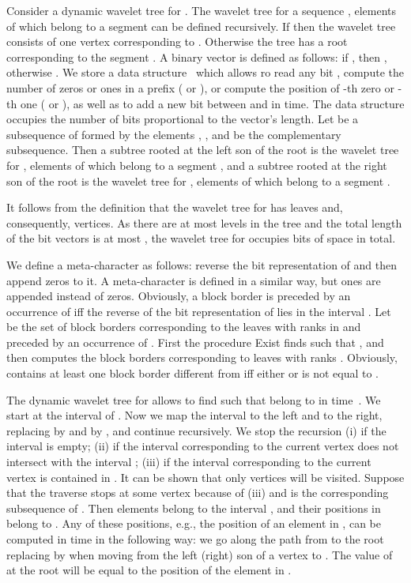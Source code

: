 \documentclass[10pt]{llncs}
\newcommand{\exist}{{\sc Exist}}
\begin{document}
Consider a dynamic wavelet tree for . The wavelet tree for a sequence , elements of which belong to a segment  can be defined recursively. If  then the wavelet tree consists of one vertex corresponding to . Otherwise the tree has a root corresponding to the segment . A binary vector  is defined as follows: if , then , otherwise . We store a data structure~\cite{Makinen:2008:DES:1367064.1367072} which allows ro read any bit , compute the number of zeros or ones in a prefix  ( or  ), or compute the position of -th zero or -th one ( or ), as well as to add a new bit between  and  in  time. The data structure occupies the number of bits proportional to the vector's length. Let  be a subsequence of  formed by the elements , , and  be the complementary subsequence. Then a subtree rooted at the left son of the root is the wavelet tree for , elements of which belong to a segment , and a subtree rooted at the right son of the root is the wavelet tree for , elements of which belong to a segment .

It follows from the definition that the wavelet tree for  has  leaves and, consequently,  vertices. As there are at most  levels in the tree and the total length of the bit vectors is at most , the wavelet tree for  occupies  bits of space in total.

We define a meta-character  as follows: reverse the bit representation of  and then append  zeros to it. A meta-character  is defined in a similar way, but ones are appended instead of zeros. Obviously, a block border  is preceded by an occurrence of  iff the reverse of the bit representation of  lies in the interval . Let  be the set of block borders corresponding to the leaves with ranks in  and preceded by an occurrence of . First the procedure \exist{} finds  such that , and then computes the block borders  corresponding to leaves with ranks . Obviously,  contains at least one block border different from  iff either  or  is not equal to .

The dynamic wavelet tree for  allows to find  such that  belong to  in  time~\cite{Makinen06position-restrictedsubstring}. We start at the interval  of . Now we map the interval to the left and to the right, replacing  by  and  by , and continue recursively. We stop the recursion (i) if the interval  is empty; (ii) if the interval corresponding to the current vertex does not intersect with the interval ; (iii) if the interval corresponding to the current vertex is contained in . It can be shown that only  vertices will be visited. Suppose that the traverse stops at some vertex  because of (iii) and  is the corresponding subsequence of . Then elements  belong to the interval , and their positions in  belong to . Any of these positions, e.g., the position of an element  in , can be computed in  time in the following way: we go along the path from  to the root replacing  by  when moving from the left (right) son of a vertex  to . The value of  at the root will be equal to the position of the element  in .
\end{document}
